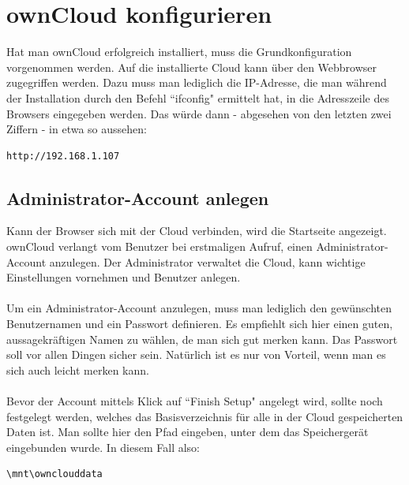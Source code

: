 \section{ownCloud konfigurieren}
Hat man ownCloud erfolgreich installiert, muss die Grundkonfiguration vorgenommen werden. Auf die installierte Cloud kann über den Webbrowser zugegriffen werden. Dazu muss man lediglich die IP-Adresse, die man während der Installation durch den Befehl ``ifconfig" ermittelt hat, in die Adresszeile des Browsers eingegeben werden. Das würde dann - abgesehen von den letzten zwei Ziffern - in etwa so aussehen: 

\begin{lstlisting}
http://192.168.1.107
\end{lstlisting}

\subsection{Administrator-Account anlegen}
Kann der Browser sich mit der Cloud verbinden, wird die Startseite angezeigt. ownCloud verlangt vom Benutzer bei erstmaligen Aufruf, einen Administrator-Account anzulegen. Der Administrator verwaltet die Cloud, kann wichtige Einstellungen vornehmen und Benutzer anlegen.
\\
\\
Um ein Administrator-Account anzulegen, muss man lediglich den gewünschten Benutzernamen und ein Passwort definieren. Es empfiehlt sich hier einen guten, aussagekräftigen Namen zu wählen, de  man sich gut merken kann. Das Passwort soll vor allen Dingen sicher sein. Natürlich ist es nur von Vorteil, wenn man es sich auch leicht merken kann. 
\\
\\
Bevor der Account mittels Klick auf ``Finish Setup" angelegt wird, sollte noch festgelegt werden, welches das Basisverzeichnis für alle in der Cloud gespeicherten Daten ist. Man sollte hier den Pfad eingeben, unter dem das Speichergerät eingebunden wurde. In diesem Fall also:

\begin{lstlisting}
\mnt\ownclouddata
\end{lstlisting}

